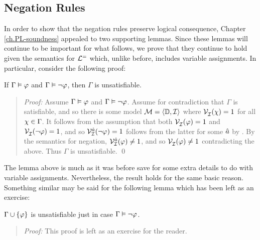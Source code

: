 \subsection{Negation Rules}%
  \label{sub:NegationRules}

In order to show that the negation rules preserve logical consequence, Chapter \ref{ch.PL-soundness} appealed to two supporting lemmas.
Since these lemmas will continue to be important for what follows, we prove that they continue to hold given the semantics for $\mathcal{L}^{=}$ which, unlike before, includes variable assignments.
In particular, consider the following proof:
  
\begin{Lthm} \label{lemma:unsat}
  If $\Gamma \vDash \varphi$ and $\Gamma \vDash \neg\varphi$, then $\Gamma$ is unsatisfiable.
\end{Lthm}

\begin{quote} 
  \textit{Proof:} Assume $\Gamma \vDash \varphi$ and $\Gamma \vDash \neg\varphi$.
  Assume for contradiction that $\Gamma$ is satisfiable, and so there is some model $\mathcal{M} = \langle\mathbb{D}, \mathcal{I}\rangle$ where $\mathcal{V}_{\mathcal{I}}^{}(\chi) = 1$ for all $\chi \in \Gamma$. 
  It follows from the assumption that both $\mathcal{V}_{\mathcal{I}}^{}(\varphi) = 1$ and $\mathcal{V}_{\mathcal{I}}^{}(\neg \varphi) = 1$, and so $\mathcal{V}_{\mathcal{I}}^{\hat{a}}(\neg\varphi)=1$ follows from the latter for some $\hat{a}$ by .
  By the semantics for negation, $\mathcal{V}_{\mathcal{I}}^{\hat{a}}(\varphi)\neq 1$, and so $\mathcal{V}_{\mathcal{I}}^{}(\varphi) \neq 1$ contradicting the above.
  Thus $\Gamma$ is unsatisfiable. 
  \qed
\end{quote}



The lemma above is much as it was before save for some extra details to do with variable assignments.
Nevertheless, the result holds for the same basic reason.
Something similar may be said for the following lemma which has been left as an exercise:


\begin{Lthm} \label{lemma:unsatent}
  $\Gamma \cup \lbrace\varphi\rbrace$ is unsatisfiable just in case $\Gamma \vDash \neg\varphi$.
\end{Lthm}

\begin{quote} 
  \textit{Proof:}
  This proof is left as an exercise for the reader.
\end{quote}

